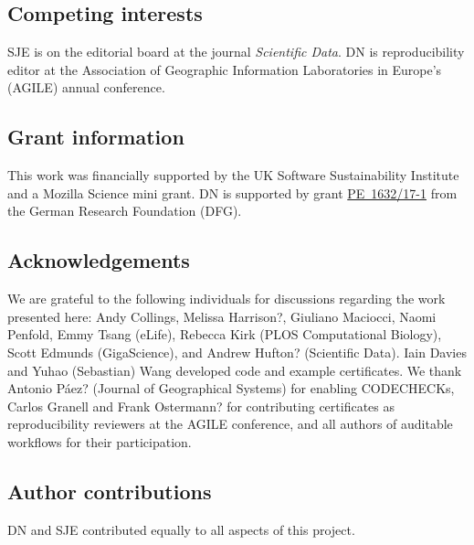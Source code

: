 \documentclass[12pt]{article}
\begin{document}
\subsection*{Competing interests}

SJE is on the editorial board at the journal \emph{Scientific Data}.
DN is reproducibility editor at the Association of Geographic
Information Laboratories in Europe's (AGILE) annual conference.

\subsection*{Grant information}

This work was financially supported by the UK Software
Sustainability Institute and a Mozilla Science mini grant.
DN is supported by grant
\href{https://gepris.dfg.de/gepris/projekt/415851837}{PE~1632/17-1}
from the German Research Foundation (DFG).

\subsection*{Acknowledgements}\label{acknowledgements}

We are grateful to the following individuals for discussions regarding
the work presented here: Andy Collings, Melissa Harrison?, Giuliano
Maciocci, Naomi Penfold, Emmy Tsang (eLife), Rebecca Kirk (PLOS
Computational Biology), Scott Edmunds (GigaScience), and Andrew
Hufton? (Scientific Data). Iain Davies and Yuhao (Sebastian) Wang
developed code and example certificates.  We thank Antonio P\'{a}ez?
(Journal of Geographical Systems) for enabling CODECHECKs, Carlos
Granell and Frank Ostermann? for contributing certificates as
reproducibility reviewers at the AGILE conference, and all authors of
auditable workflows for their participation.

\subsection*{Author contributions}

DN and SJE contributed equally to all aspects of this project.

{\small
}
\end{document}
